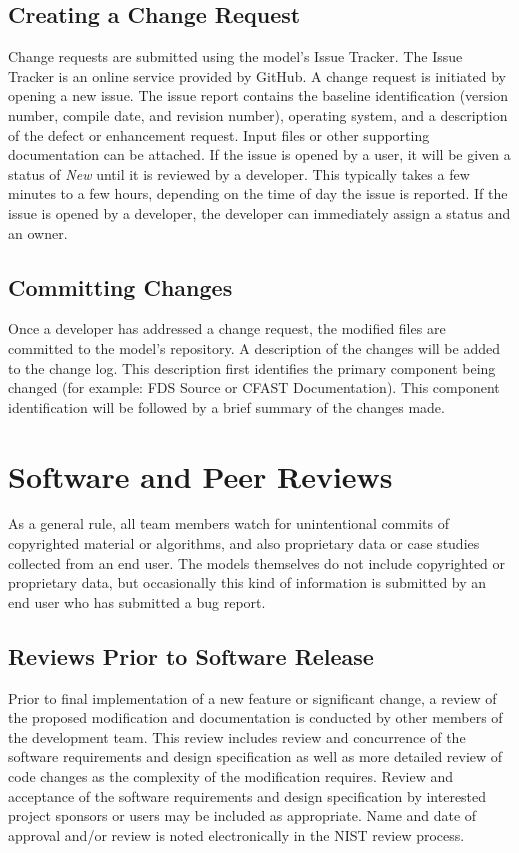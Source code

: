 \documentclass[11pt]{book}
\begin{document}
\subsection{Creating a Change Request}

Change requests are submitted using the model's Issue Tracker.  The Issue Tracker is an online service provided by GitHub. A change request is initiated by opening a new issue.  The issue report contains the baseline identification (version number, compile date, and revision number), operating system, and a description of the defect or enhancement request.  Input files or other supporting documentation can be attached. If the issue is opened by a user, it will be given a status of {\em New} until it is reviewed by a developer. This typically takes a few minutes to a few hours, depending on the time of day the issue is reported. If the issue is opened by a developer, the developer can immediately assign a status and an owner.


\subsection{Committing Changes}

Once a developer has addressed a change request, the modified files are committed to the model's repository.  A description of the changes will be added to the change log.  This description first identifies the primary component being changed (for example: FDS Source or CFAST Documentation).  This component identification will be followed by a brief summary of the changes made.



\section{Software and Peer Reviews}


As a general rule, all team members watch for unintentional commits of copyrighted material or algorithms, and also proprietary data or case studies collected from an end user. The models themselves do not include copyrighted or proprietary data, but occasionally this kind of information is submitted by an end user who has submitted a bug report.

\subsection{Reviews Prior to Software Release}

Prior to final implementation of a new feature or significant change, a review of the proposed modification and documentation is conducted by other members of the development team.  This review includes review and concurrence of the software requirements and design specification as well as more detailed review of code changes as the complexity of the modification requires. Review and acceptance of the software requirements and design specification by interested project sponsors or users may be included as appropriate. Name and date of approval and/or review is noted electronically in the NIST review process.
\end{document}
